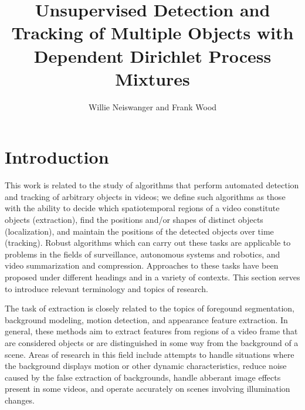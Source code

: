 \documentclass{article}
\begin{document}
\title{Unsupervised Detection and Tracking of Multiple Objects with Dependent Dirichlet Process Mixtures}
\author{Willie Neiswanger and Frank Wood}
\maketitle
\mbox{}





\section{Introduction}




This work is related to the study of algorithms that perform automated detection and tracking of arbitrary objects in videos; we define such algorithms as those with the ability to decide which spatiotemporal regions of a video constitute objects (extraction), find the positions and/or shapes of distinct objects (localization), and maintain the positions of the detected objects over time (tracking). Robust algorithms which can carry out these tasks are applicable to problems in the fields of surveillance, autonomous systems and robotics, and video summarization and compression. Approaches to these tasks have been proposed under different headings and in a variety of contexts. This section serves to introduce relevant terminology and topics of research.

The task of extraction is closely related to the topics of foregound segmentation, background modeling, motion detection, and appearance feature extraction. In general, these methods aim to extract features from regions of a video frame that are considered objects or are distinguished in some way from the background of a scene. Areas of research in this field include attempts to handle situations where the background displays motion or other dynamic characteristics, reduce noise caused by the false extraction of backgrounds, handle abberant image effects present in some videos, and operate accurately on scenes involving illumination changes.
\end{document}
